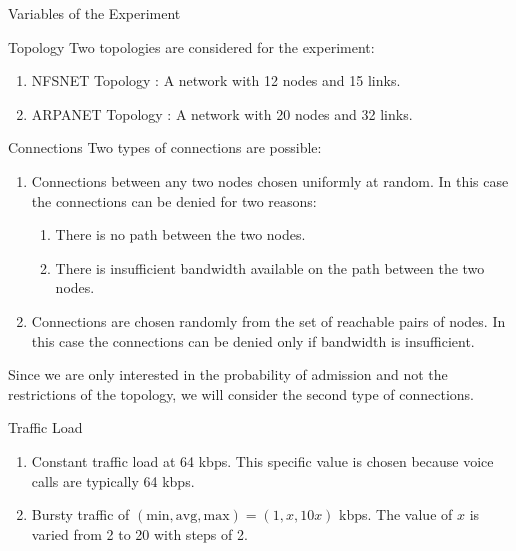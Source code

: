 \begin{section}{Variables of the Experiment}

    \begin{subsection}{Topology}
        Two topologies are considered for the experiment:
        \begin{enumerate}
            \item NFSNET Topology : A network with 12 nodes and 15 links.
            \item ARPANET Topology : A network with 20 nodes and 32 links.
        \end{enumerate}
    \end{subsection}

    \begin{subsection}{Connections}
    Two types of connections are possible:
    \begin{enumerate}
        \item Connections between any two nodes chosen uniformly at random. In this case the connections can be denied for two reasons:
        \begin{enumerate}
            \item There is no path between the two nodes.
            \item There is insufficient bandwidth available on the path between the two nodes.
        \end{enumerate}
        \item Connections are chosen randomly from the set of reachable pairs of nodes. In this case the connections can be denied only if bandwidth is insufficient.
    \end{enumerate}
    Since we are only interested in the probability of admission and not the restrictions of the topology, we will consider the second type of connections.
    \end{subsection}

    \begin{subsection}{Traffic Load}
        \begin{enumerate}
            \item Constant traffic load at 64 kbps. This specific value is chosen because voice calls are typically 64 kbps.
            \item Bursty traffic of $(\text{min}, \text{avg}, \text{max}) = (1, x, 10x)$ kbps. The value of $x$ is varied from 2 to 20 with steps of 2.
        \end{enumerate}
    \end{subsection}
    


\end{section}
